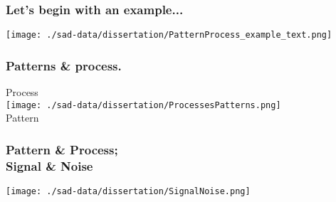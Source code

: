 \documentclass[14pt]{beamer}
\begin{document}
\begin{frame}
\frametitle{Let's begin with an example...}
\begin{center}
\texttt{[image: ./sad-data/dissertation/PatternProcess\_example\_text.png]}\\
\end{center}
\end{frame}

\begin{frame}
\frametitle{Patterns \& process.}
\begin{huge}
\begin{center}
Process\\ 
\texttt{[image: ./sad-data/dissertation/ProcessesPatterns.png]}\\
Pattern\\
\end{center}
\end{huge}
\end{frame}

\begin{frame}
\frametitle{Pattern \& Process;\\ Signal \& Noise}
\begin{center}
\texttt{[image: ./sad-data/dissertation/SignalNoise.png]}
\end{center}
\end{frame}

\end{document}
